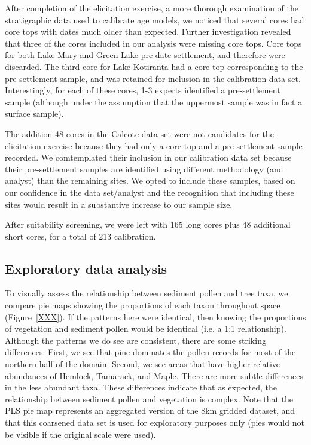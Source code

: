 \documentclass[12pt]{article}
\begin{document}
After completion of the elicitation exercise, a more thorough
examination of the stratigraphic data used to calibrate age models, we
noticed that several cores had core tops with dates much older than
expected. Further investigation revealed that three of the cores
included in our analysis were missing core tops. Core tops for both
Lake Mary and Green Lake pre-date settlement, and therefore were
discarded. The third core for Lake Kotiranta had a core top
corresponding to the pre-settlement sample, and was retained for
inclusion in the calibration data set. Interestingly, for each of
these cores, 1-3 experts identified a pre-settlement sample (although
under the assumption that the uppermost sample was in fact a surface
sample).

The addition 48 cores in the Calcote data set were not candidates for
the elicitation exercise because they had only a core top and a
pre-settlement sample recorded. We comtemplated their inclusion in our
calibration data set because their pre-settlement samples are
identified using different methodology (and analyst) than the
remaining sites. We opted to include these samples, based on our
confidence in the data set/analyst and the recognition that including
these sites would result in a substantive increase to our sample size.

After suitability screening, we were left with 165 long cores plus 48
additional short cores, for a total of 213 calibration.

\subsection{Exploratory data analysis}

To visually assess the relationship between sediment pollen and tree
taxa, we compare pie maps showing the proportions of each taxon
throughout space (Figure~\ref{XXX}). If the patterns here were
identical, then knowing the proportions of vegetation and sediment
pollen would be identical (i.e. a 1:1 relationship). Although the
patterns we do see are consistent, there are some striking
differences. First, we see that pine dominates the pollen records for
most of the northern half of the domain. Second, we see areas that
have higher relative abundances of Hemlock, Tamarack, and Maple. There
are more subtle differences in the less abundant taxa. These
differences indicate that as expected, the relationship between
sediment pollen and vegetation is complex. Note that the PLS pie map
represents an aggregated version of the 8km gridded dataset, and that
this coarsened data set is used for exploratory purposes only (pies
would not be visible if the original scale were used).
\end{document}
